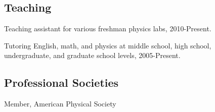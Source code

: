 \documentclass[letterpaper]{article}
\renewenvironment{itemize}{
\begin{list}{}{
\setlength{\leftmargin}{1.5em}
}
}{
\end{list}
}
\begin{document}
\subsection*{Teaching}
\begin{itemize}
\item Teaching assistant for various freshman physics labs, 2010-Present.
\item Tutoring English, math, and physics at middle school, high school, undergraduate, and graduate school levels, 2005-Present.
\end{itemize}

\subsection*{Professional Societies}
\begin{itemize}
\item Member, American Physical Society
\end{itemize}
\end{document}
